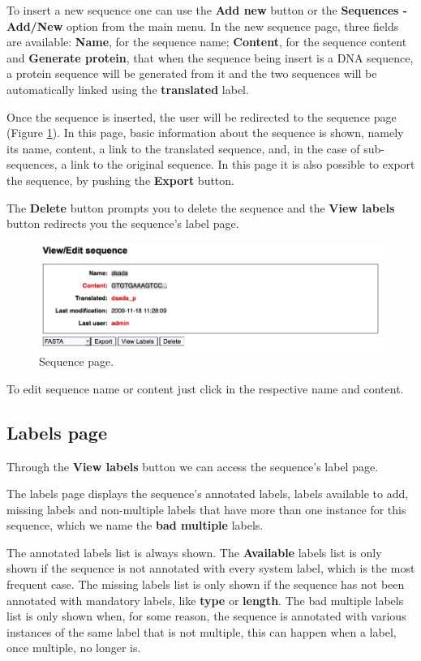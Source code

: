 To insert a new sequence one can use the \textbf{Add new} button or the \textbf{Sequences - Add/New}
option from the main menu. In the new sequence page, three fields are available: \textbf{Name}, for the
sequence name; \textbf{Content}, for the sequence content and \textbf{Generate protein}, that when the
sequence being insert is a DNA sequence, a protein sequence will be generated from it and the two sequences
will be automatically linked using the \textbf{translated} label.

Once the sequence is inserted, the user will be redirected to the sequence page (Figure \ref{fig:view_sequence}).
In this page, basic information about the sequence is shown, namely its name, content,
a link to the translated sequence, and, in the case of
sub-sequences, a link to the original sequence. In this page it is also possible to export the sequence,
by pushing the \textbf{Export} button.

The \textbf{Delete} button prompts you to delete the sequence and the \textbf{View labels} button
redirects you the sequence's label page.

\begin{figure}[H]
  \centering
    \includegraphics[scale=0.4]{view_sequence.png}
  \caption{Sequence page.}
  \label{fig:view_sequence}
\end{figure}

To edit sequence name or content just click in the respective name and content.

\subsection{Labels page}

Through the \textbf{View labels} button we can access the sequence's label page.

The labels page displays the sequence's annotated labels, labels available to add,
missing labels and non-multiple labels that have more than one instance for this sequence,
which we name the \textbf{bad multiple} labels.

The annotated labels list is always shown. The \textbf{Available} labels list
is only shown if the sequence is not annotated with every system label, which is the most frequent case.
The missing labels list is only shown if the sequence has not been annotated with
mandatory labels, like \textbf{type} or \textbf{length}. The bad multiple labels list
is only shown when, for some reason, the sequence is annotated with various instances of
the same label that is not multiple, this can happen when a label, once multiple, no longer is.

